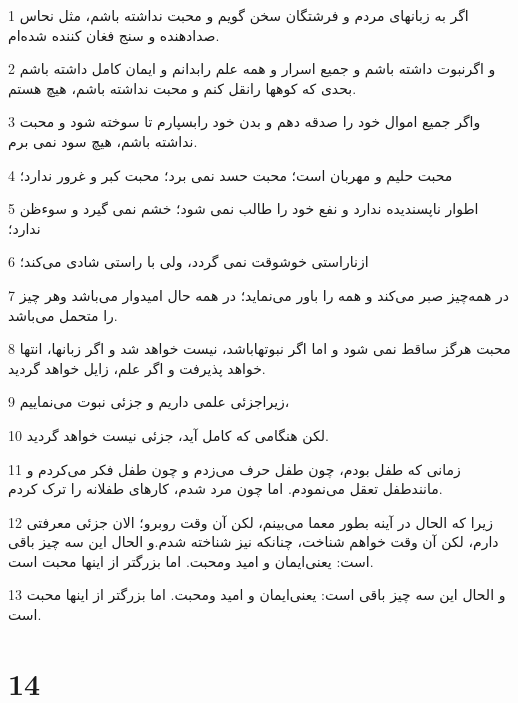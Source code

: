 \par 1 اگر به زبانهای مردم و فرشتگان سخن گویم و محبت نداشته باشم، مثل نحاس صدادهنده و سنج فغان کننده شده‌ام.
\par 2 و اگرنبوت داشته باشم و جمیع اسرار و همه علم رابدانم و ایمان کامل داشته باشم بحدی که کوهها رانقل کنم و محبت نداشته باشم، هیچ هستم.
\par 3 واگر جمیع اموال خود را صدقه دهم و بدن خود رابسپارم تا سوخته شود و محبت نداشته باشم، هیچ سود نمی برم.
\par 4 محبت حلیم و مهربان است؛ محبت حسد نمی برد؛ محبت کبر و غرور ندارد؛
\par 5 اطوار ناپسندیده ندارد و نفع خود را طالب نمی شود؛ خشم نمی گیرد و سوءظن ندارد؛
\par 6 ازناراستی خوشوقت نمی گردد، ولی با راستی شادی می‌کند؛
\par 7 در همه‌چیز صبر می‌کند و همه را باور می‌نماید؛ در همه حال امیدوار می‌باشد وهر چیز را متحمل می‌باشد.
\par 8 محبت هرگز ساقط نمی شود و اما اگر نبوتهاباشد، نیست خواهد شد و اگر زبانها، انتها خواهد پذیرفت و اگر علم، زایل خواهد گردید.
\par 9 زیراجزئی علمی داریم و جزئی نبوت می‌نماییم،
\par 10 لکن هنگامی که کامل آید، جزئی نیست خواهد گردید.
\par 11 زمانی که طفل بودم، چون طفل حرف می‌زدم و چون طفل فکر می‌کردم و مانندطفل تعقل می‌نمودم. اما چون مرد شدم، کارهای طفلانه را ترک کردم.
\par 12 زیرا که الحال در آینه بطور معما می‌بینم، لکن آن وقت روبرو؛ الان جزئی معرفتی دارم، لکن آن وقت خواهم شناخت، چنانکه نیز شناخته شدم.و الحال این سه چیز باقی است: یعنی‌ایمان و امید ومحبت. اما بزرگتر از اینها محبت است.
\par 13 و الحال این سه چیز باقی است: یعنی‌ایمان و امید ومحبت. اما بزرگتر از اینها محبت است.

\chapter{14}

